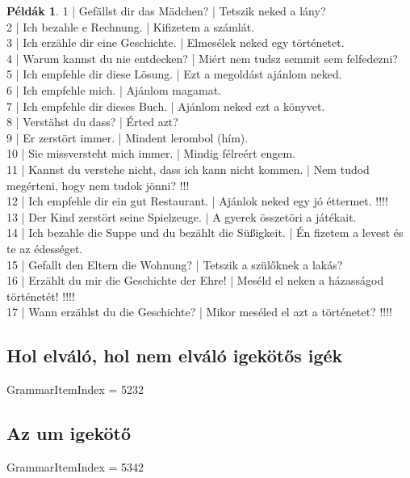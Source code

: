 \documentclass{article}
\theoremstyle{definition}
\newtheorem*{exmp}{Példák}
\begin{document}
\begin{exmp}
1 | Gefällst dir das Mädchen? | Tetszik neked a lány?\\
2 | Ich bezahle e Rechnung. | Kifizetem a számlát.\\
3 | Ich erzähle dir eine Geschichte. | Elmesélek neked egy történetet.\\
4 | Warum kannst du nie entdecken? | Miért nem tudsz semmit sem felfedezni?\\
5 | Ich empfehle dir diese Lösung. | Ezt a megoldást ajánlom neked.\\
6 | Ich empfehle mich. | Ajánlom magamat.\\
7 | Ich empfehle dir dieses Buch. | Ajánlom neked ezt a könyvet.\\
8 | Verstähst du dass? | Érted azt?\\
9 | Er zerstört immer. | Mindent lerombol (hím).\\
10 | Sie missversteht mich immer. | Mindig félreért engem.\\
11 | Kannst du verstehe nicht, dass ich kann nicht kommen. | Nem tudod megérteni, hogy nem tudok jönni? !!!\\
12 | Ich empfehle dir ein gut Restaurant. | Ajánlok neked egy jó éttermet. !!!!\\
13 | Der Kind zerstört seine Spielzeuge. | A gyerek összetöri a játékait.\\
14 | Ich bezahle die Suppe und du bezählt die Süßigkeit. | Én fizetem a levest és te az édességet.\\
15 | Gefallt den Eltern die Wohnung? | Tetszik a szülőknek a lakás?\\
16 | Erzählt du mir die Geschichte der Ehre! | Meséld el neken a házasságod történetét! !!!!\\
17 | Wann erzählst du die Geschichte? | Mikor meséled el azt a történetet? !!!!\\
\end{exmp}

\subsection{Hol elváló, hol nem elváló igekötős igék}

GrammarItemIndex = 5232

\subsection{Az um igekötő}

GrammarItemIndex = 5342
\end{document}
